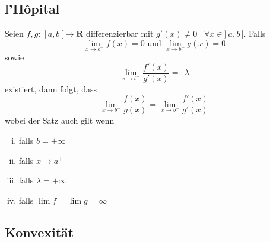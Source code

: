 \documentclass[8pt]{article}
\begin{document}
\begin{multicols*}{3}
\subsection{l'Hôpital}

Seien $f, g: \; ]\,a, b\,[ \rightarrow \mathbf{R}$ differenzierbar mit $g'(x) \neq 0 \;\;\; \forall x \in ]\,a, b\,[$.
Falls $$\lim_{x \rightarrow b^-} f(x) = 0 \text{ und } \lim_{x \rightarrow b^-} g(x) = 0$$
sowie $$\lim_{x \rightarrow b^-} \frac{f'(x)}{g'(x)} =: \lambda$$ existiert, dann folgt, dass
$$\lim_{x \rightarrow b^-} \frac{f(x)}{g(x)} = \lim_{x \rightarrow b^-} \frac{f'(x)}{g'(x)}$$
wobei der Satz auch gilt wenn
\begin{enumerate}[(i)]
  \item falls $b = +\infty$
  \item falls $x \rightarrow a^+$
  \item falls $\lambda = +\infty$
  \item falls $\lim f = \lim g = \infty$
\end{enumerate}

\subsection{Konvexität}


\end{multicols*}
\end{document}

